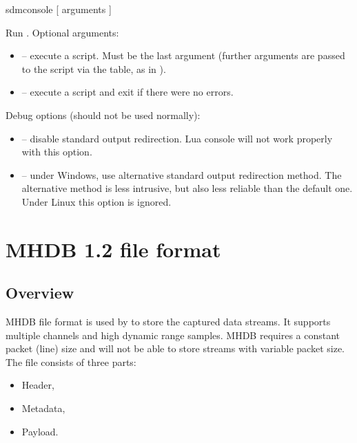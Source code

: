 \documentclass[a4paper,12pt,twoside,extrafontsizes]{memoir}
\begin{document}
\begin{shellcmds}
sdmconsole [ arguments ]
\end{shellcmds}

Run . Optional arguments:

\begin{itemize}
	\item {} -- execute a script. Must be the last argument (further arguments are passed to the script via the  table, as in ).
	\item {} -- execute a script and exit if there were no errors.
\end{itemize}

Debug options (should not be used normally):

\begin{itemize}
	\item {} -- disable standard output redirection. Lua console will not work properly with this option.
	\item {} -- under Windows, use alternative standard output redirection method. The alternative method is less intrusive, but also less reliable than the default one. Under Linux this option is ignored.
\end{itemize}

\chapter{MHDB 1.2 file format}
\label{app:mhdbformat}

\section{Overview}

MHDB file format is used by  to store the captured data streams. It supports multiple channels and high dynamic range samples. MHDB requires a constant packet (line) size and will not be able to store streams with variable packet size. The file consists of three parts:

\begin{itemize}
	\item Header,
	\item Metadata,
	\item Payload.
\end{itemize}
\end{document}
